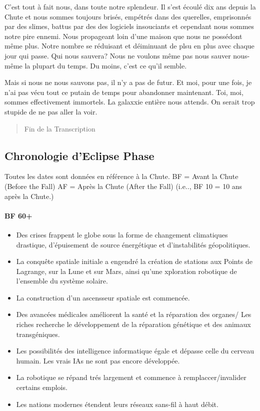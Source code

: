 C'est tout à fait nous, dans toute notre splendeur. Il s'est écoulé dix ans depuis la Chute et nous sommes toujours brisés, empétrés dans des querelles, emprisonnés par des slimes, battus par des des logiciels insouciants et cependant nous sommes notre pire ennemi. Nous propageant loin d'une maison que nous ne possédont même plus. Notre nombre se réduisant et déiminuant de plsu en plus avec chaque jour qui passe. Qui nous sauvera? Nous ne voulons même pas nous sauver nous-même la plupart du temps. Du moins, c'est ce qu'il semble. 

Mais si nous ne nous sauvons pas, il n'y a pas de futur. Et moi, pour une fois, je n'ai pas vécu tout ce putain de temps pour abandonner maintenant. Toi, moi, sommes effectivement immortels. La galaxxie entière nous attends. On serait trop stupide de ne pas aller la voir. 

\begin{quotation} Fin de la Transcription \end{quotation} 

\subsection{Chronologie d'Eclipse Phase} \label{sec:eclipse-phase-timel} 

Toutes les dates sont données en référence à la Chute. BF = Avant la Chute (Before the Fall) AF = Après la Chute (After the Fall) (i.e.., BF 10 = 10 ans après la Chute.) \paragraph{ BF 60+} 

\begin{itemize} \item Des crises frappent le globe sous la forme de changement climatiques drastique, d'épuisement de source énergétique et d'instabilités géopolitiques. \item La conquête spatiale initiale a engendré la création de stations aux Points de Lagrange, sur la Lune et sur Mars, ainsi qu'une xploration robotique de l'ensemble du système solaire. \item La construction d'un ascensseur spatiale est commencée. \item Des avancées médicales améliorent la santé et la réparation des organes/ Les riches recherche le développement de la réparation génétique et des animaux transgéniques. \item Les possibilités des intelligence informatique égale et dépasse celle du cerveau humain. Les vrais IAs ne sont pas encore développée. \item La robotique se répand trés largement et commence à remplaccer/invalider certains emplois. \item Les nations modernes étendent leurs réseaux sans-fil à haut débit. \end{itemize} 

